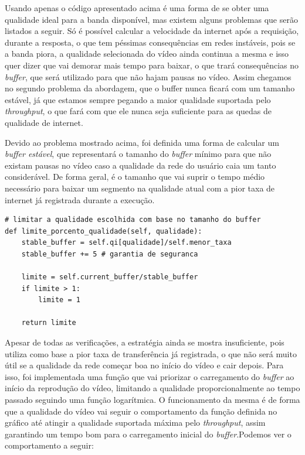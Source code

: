 \documentclass[12pt]{article}
\begin{document}
Usando apenas o código apresentado acima é uma forma de se obter uma qualidade ideal para a banda disponível, mas existem alguns problemas que serão listados a seguir. Só é possível calcular a velocidade da internet após a requisição, durante a resposta, o que tem péssimas consequências em redes instáveis, pois se a banda piora, a qualidade selecionada do vídeo ainda continua a mesma e isso quer dizer que vai demorar mais tempo para baixar, o que trará consequências no \textit{buffer}, que será utilizado para que não hajam pausas no vídeo. Assim chegamos no segundo problema da abordagem, que o buffer nunca ficará com um tamanho estável, já que estamos sempre pegando a maior qualidade suportada pelo \textit{throughput}, o que fará com que ele nunca seja suficiente para as quedas de qualidade de internet.

Devido ao problema mostrado acima, foi definida uma forma de calcular um \textit{buffer estável}, que representará o tamanho do \textit{buffer} mínimo para que não existam pausas no vídeo caso a qualidade da rede do usuário caia um tanto considerável. De forma geral, é o tamanho que vai suprir o tempo médio necessário para baixar um segmento na qualidade atual com a pior taxa de internet já registrada durante a execução.

\begin{lstlisting}
# limitar a qualidade escolhida com base no tamanho do buffer
def limite_porcento_qualidade(self, qualidade):
    stable_buffer = self.qi[qualidade]/self.menor_taxa
    stable_buffer += 5 # garantia de seguranca

    limite = self.current_buffer/stable_buffer
    if limite > 1:
        limite = 1

    return limite
\end{lstlisting}

Apesar de todas as verificações, a estratégia ainda se mostra insuficiente, pois utiliza como base a pior taxa de transferência já registrada, o que não será muito útil se a qualidade da rede começar boa no início do vídeo e cair depois. Para isso, foi implementada uma função que vai priorizar o carregamento do \textit{buffer} ao início da reprodução do vídeo, limitando a qualidade proporcionalmente ao tempo passado seguindo uma função logarítmica. O funcionamento da mesma é de forma que a qualidade do vídeo vai seguir o comportamento da função definida no gráfico até atingir a qualidade suportada máxima pelo \textit{throughput}, assim garantindo um tempo bom para o carregamento inicial do \textit{buffer}.Podemos ver o comportamento a seguir:
\end{document}
